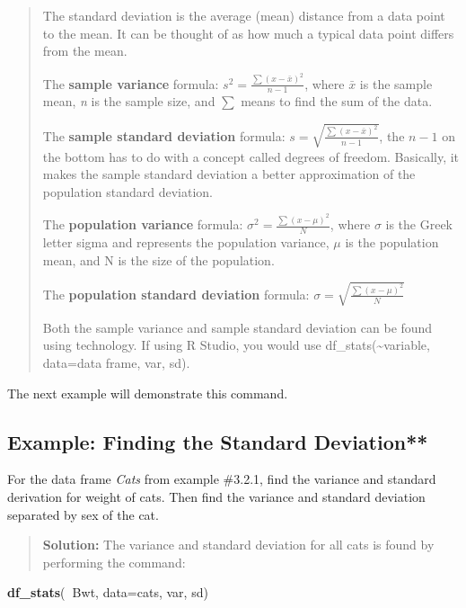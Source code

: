 \documentclass[]{book}
\newenvironment{Shaded}{\begin{snugshade}}{\end{snugshade}}
\newcommand{\DataTypeTok}[1]{\textcolor[rgb]{0.13,0.29,0.53}{#1}}
\newcommand{\KeywordTok}[1]{\textcolor[rgb]{0.13,0.29,0.53}{\textbf{#1}}}
\newcommand{\NormalTok}[1]{#1}
\newcommand{\OperatorTok}[1]{\textcolor[rgb]{0.81,0.36,0.00}{\textbf{#1}}}
\begin{document}
\begin{quote}
The standard deviation is the average (mean) distance from a data point
to the mean. It can be thought of as how much a typical data point
differs from the mean.

The \textbf{sample variance} formula:
\(s^2=\frac{\sum\left(x-\bar{x}\right)^2}{n-1}\), where \(\bar{x}\) is the sample mean, \emph{n} is the sample size, and \(\sum{}\) means to find the sum of the data.

The \textbf{sample standard deviation} formula:
\(s=\sqrt{ \frac{\sum\left(x-\bar{x}\right)^2}{n-1}}\), the \(n-1\) on the bottom has to do with a concept called degrees of freedom. Basically, it makes the sample standard deviation a better approximation of the population standard deviation.

The \textbf{population variance} formula:
\(\sigma^2 = \frac{\sum\left(x-\mu \right)^2}{N}\), where \(\sigma\) is the Greek letter sigma and represents the population variance,
\(\mu\) is the population mean, and N is the size of the population.

The \textbf{population standard deviation} formula:
\(\sigma =\sqrt{ \frac{\sum\left(x-\mu \right)^2}{N}}\)

Both the sample variance and sample standard deviation can be found using technology. If using R Studio, you would use df\_stats(\textasciitilde{}variable, data=data frame, var, sd).
\end{quote}

The next example will demonstrate this command.

\hypertarget{example-finding-the-standard-deviation}{%
\subsection{Example: Finding the Standard Deviation**}\label{example-finding-the-standard-deviation}}

For the data frame \emph{Cats} from example \#3.2.1, find the variance and standard derivation for weight of cats. Then find the variance and standard deviation separated by sex of the cat.

\begin{quote}
\textbf{Solution:}
The variance and standard deviation for all cats is found by performing the command:
\end{quote}

\begin{Shaded}
\begin{Highlighting}[]
\KeywordTok{df_stats}\NormalTok{(}\OperatorTok{~}\NormalTok{Bwt, }\DataTypeTok{data=}\NormalTok{cats, var, sd)}
\end{Highlighting}
\end{Shaded}
\end{document}
